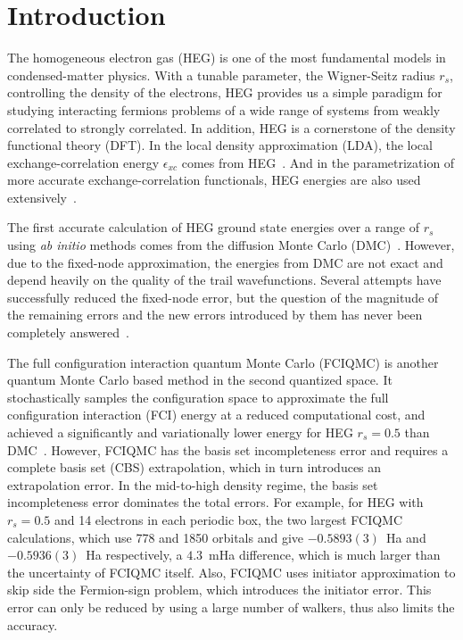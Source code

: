 \section{Introduction}
The homogeneous electron gas (HEG) is one of the most fundamental models in condensed-matter physics.
With a tunable parameter, the Wigner-Seitz radius $r_s$, controlling the density of the electrons, HEG provides us a simple paradigm for studying interacting fermions problems of a wide range of systems from weakly correlated to strongly correlated.
In addition, HEG is a cornerstone of the density functional theory (DFT).
In the local density approximation (LDA), the local exchange-correlation energy $\epsilon_{xc}$ comes from HEG~\cite{perdew1986density, dahl2013local}. 
And in the parametrization of more accurate exchange-correlation functionals, HEG energies are also used extensively~\cite{lundqvist2013theory}.

The first accurate calculation of HEG ground state energies over a range of $r_s$ using \textit{ab initio} methods comes from the diffusion Monte Carlo (DMC)~\cite{ceperley1980ground}. However, due to the fixed-node approximation, the energies from DMC are not exact and depend heavily on the quality of the trail wavefunctions.
Several attempts have successfully reduced the fixed-node error, but the question of the magnitude of the remaining errors and the new errors introduced by them has never been completely answered~\cite{kwon1998effects, rios2006inhomogeneous}.

The full configuration interaction quantum Monte Carlo (FCIQMC) is another quantum Monte Carlo based method in the second quantized space. It stochastically samples the configuration space to approximate the full configuration interaction (FCI) energy at a reduced computational cost, and achieved a significantly and variationally lower energy for HEG $r_s=0.5$ than DMC~\cite{shepherd2012investigation}.
However, FCIQMC has the basis set incompleteness error and requires a complete basis set (CBS) extrapolation, which in turn introduces an extrapolation error.
In the mid-to-high density regime, the basis set incompleteness error dominates the total errors.
For example, for HEG with $r_s=0.5$ and 14 electrons in each periodic box, the two largest FCIQMC calculations, which use 778 and 1850 orbitals and give $-0.5893(3)$~Ha and $-0.5936(3)$~Ha respectively, a $4.3$~mHa difference, which is much larger than the uncertainty of FCIQMC itself.
Also, FCIQMC uses initiator approximation to skip side the Fermion-sign problem, which introduces the initiator error.
This error can only be reduced by using a large number of walkers, thus also limits the accuracy.

